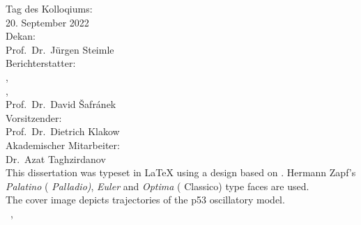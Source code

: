 \thispagestyle{empty}

\hfill
\vfill

{\raggedright
\noindent
Tag des Kolloqiums: \\
\hspace*{20pt}20. September 2022 \\
Dekan:\\
\hspace*{20pt}Prof.\ Dr.\ Jürgen Steimle\\
Berichterstatter:\\
\hspace*{20pt}\myProf,\\
\hspace*{20pt}\myOtherProf,\\
\hspace*{20pt}Prof.\ Dr.\ David Šafránek \\
Vorsitzender: \\
\hspace*{20pt}Prof.\ Dr.\ Dietrich Klakow\\
Akademischer Mitarbeiter:\\
\hspace{20pt}Dr.\ Azat Taghzirdanov\\
\bigskip
\noindent
This dissertation was typeset in \LaTeX{}  using a design based on \texttt{\classicthesis}.
Hermann Zapf's \emph{Palatino} (\emph{ Palladio)}, \emph{Euler} and \emph{Optima} ( Classico) type faces are used.\\
The cover image depicts trajectories of the p53 oscillatory model.\\
\bigskip
\noindent
\textcopyright\ \myName, \myTime
}
